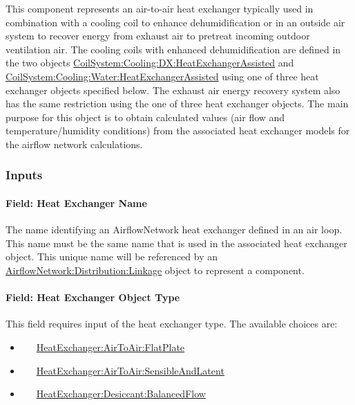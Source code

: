 This component represents an air-to-air heat exchanger typically used in combination with a cooling coil to enhance dehumidification or in an outside air system to recover energy from exhaust air to pretreat incoming outdoor ventilation air. The cooling coils with enhanced dehumidification are defined in the two objects \hyperref[coilsystemcoolingdxheatexchangerassisted]{CoilSystem:Cooling:DX:HeatExchangerAssisted} and \hyperref[coilsystemcoolingwaterheatexchangerassisted]{CoilSystem:Cooling:Water:HeatExchangerAssisted} using one of three heat exchanger objects specified below. The exhaust air energy recovery system also has the same restriction using the one of three heat exchanger objects. The main purpose for this object is to obtain calculated values (air flow and temperature/humidity conditions) from the associated heat exchanger models for the airflow network calculations.

\subsubsection{Inputs}\label{inputs-18}

\paragraph{Field: Heat Exchanger Name}\label{field-heat-exchanger-name}

The name identifying an AirflowNetwork heat exchanger defined in an air loop. This name must be the same name that is used in the associated heat exchanger object. This unique name will be referenced by an \hyperref[airflownetworkdistributionlinkage]{AirflowNetwork:Distribution:Linkage} object to represent a component.

\paragraph{Field: Heat Exchanger Object Type}\label{field-heat-exchanger-object-type}

This field requires input of the heat exchanger type. The available choices are:

\begin{itemize}
\item
  ~~~\hyperref[heatexchangerairtoairflatplate]{HeatExchanger:AirToAir:FlatPlate}
\item
  ~~~\hyperref[heatexchangerairtoairsensibleandlatent]{HeatExchanger:AirToAir:SensibleAndLatent}
\item
  ~~~\hyperref[heatexchangerdesiccantbalancedflow]{HeatExchanger:Desiccant:BalancedFlow}
\end{itemize}

